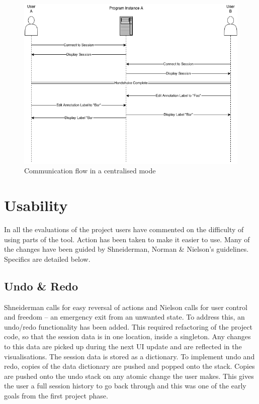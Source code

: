\begin{figure}[h!]
    \centering
    \includegraphics[width=\textwidth]{images/collaboration_single_instance.png}
    \caption{Communication flow in a centralised mode}
    \label{fig:collab_mixup_fix}
\end{figure}


\section{Usability}

In all the evaluations of the project users have commented on the difficulty of using parts of the tool.  Action has been taken to make it easier to use.  Many of the changes have been guided by Shneiderman, Norman \& Nielson's guidelines.  Specifics are detailed below.

\subsection{Undo \& Redo}
Shneiderman calls for easy reversal of actions and Nielson calls for user control and freedom -- an emergency exit from an unwanted state.  To address this, an undo/redo functionality has been added.  This required refactoring of the project code, so that the session data is in one location, inside a singleton. Any changes to this data are picked up during the next \ac{UI} update and are reflected in the visualisations.  The session data is stored as a dictionary.  To implement undo and redo, copies of the data dictionary are pushed and popped onto the stack.  Copies are pushed onto the undo stack on any atomic change the user makes.  This gives the user a full session history to go back through and this was one of the early goals from the first project phase.

